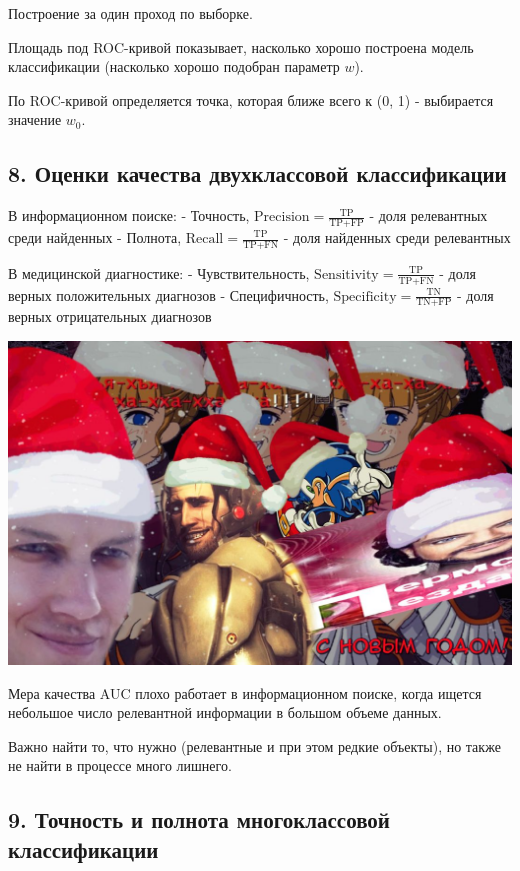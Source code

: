 Построение за один проход по выборке.

Площадь под ROC-кривой показывает, насколько хорошо построена модель
классификации (насколько хорошо подобран параметр $w$).

По ROC-кривой определяется точка, которая ближе всего к (0, 1) - выбирается
значение $w_0$.

\subsection{8. Оценки качества двухклассовой классификации}

В информационном поиске:
- Точность, $\text{Precision} = \frac{\text{TP}}{\text{TP} + \text{FP}}$ - доля релевантных среди найденных
- Полнота, $\text{Recall} = \frac{\text{TP}}{\text{TP} + \text{FN}}$ - доля найденных среди релевантных

В медицинской диагностике:
- Чувствительность, $\text{Sensitivity} = \frac{\text{TP}}{\text{TP} + \text{FN}}$ - доля верных положительных диагнозов
- Специфичность, $\text{Specificity} = \frac{\text{TN}}{\text{TN} + \text{FP}}$ - доля верных отрицательных диагнозов

\includegraphics[scale=0.3]{figures/samplefigure.jpg}

Мера качества AUC плохо работает в информационном поиске, когда ищется
небольшое число релевантной информации в большом объеме данных.

Важно найти то, что нужно (релевантные и при этом редкие объекты), но
также не найти в процессе много лишнего.

\subsection{9. Точность и полнота многоклассовой классификации}

